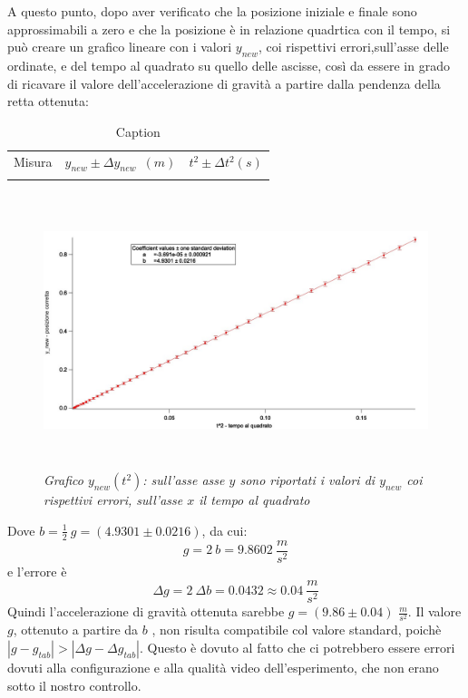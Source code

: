\documentclass[12pt, a4paper]{article}
\begin{document}
A questo punto, dopo aver verificato che la posizione iniziale e finale sono approssimabili a zero e che la posizione è in relazione quadrtica con il tempo, si può creare un grafico lineare con i valori $y_{new}$, coi rispettivi errori,sull'asse delle ordinate, e del tempo al quadrato su quello delle ascisse, così da essere in grado di ricavare il valore dell'accelerazione di gravità a partire dalla pendenza della retta ottenuta:


\begin{table}[!h]
    \centering
    \begin{tabular}{|c|c|c|}
    \hline
    \multirow{2}{*}{\small Misura} 
    &\multirow{2}{*}{\small $y_{new}\pm\Delta y_{new}$\ $(m)$}
    &\multirow{2}{*}{\small $t^2\pm \Delta t^2 (s)$}
     
    \\
    & &
    \\
    \hline
    \hline
       & &  \\
    \hline
    \end{tabular}
        \caption{Caption}
        \label{tab:logaritmi con errore}
\end{table}


  \begin{figure}[h!]
\centering
\includegraphics[width=170mm, height=80mm]{Immagini/Graph5 non comp.jpg}
\caption{\textit{{\footnotesize{Grafico $y_{new}(t^2)$: sull'asse asse $y$ sono riportati i valori di $y_{new}$ coi rispettivi errori, sull'asse $x$ il tempo al quadrato}}}}
\label{Grafico logaritmico}
\end{figure}


\newpage


Dove $\displaystyle b=\frac{1}{2}\ g=(4.9301\pm 0.0216)$, da cui:
\begin{equation*}
    g=2 \ b=9.8602 \ \frac{m}{s^2}
\end{equation*}
e l'errore è
\begin{equation*}
    \Delta g=2\ \Delta b=0.0432\approx 0.04 \ \frac{m}{s^2}
\end{equation*}
Quindi l'accelerazione di gravità ottenuta sarebbe $g=(9.86\pm0.04)$ $\frac{m}{s^2}$.
Il valore $g$, ottenuto a partire da $b$ , non risulta compatibile col valore standard, poichè $|g-g_{tab}|> |\Delta g-\Delta g_{tab}|$. Questo è dovuto al fatto che ci potrebbero essere errori dovuti alla configurazione e alla qualità video dell'esperimento, che non erano sotto il nostro controllo.
\end{document}
